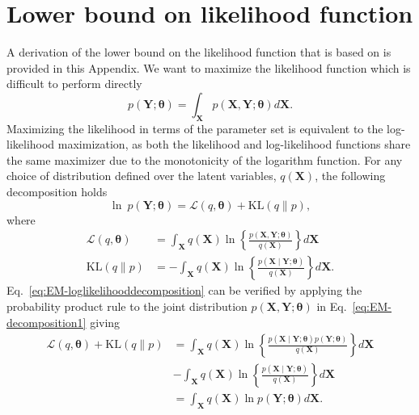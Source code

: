 \documentclass[review,authoryear,3p]{elsarticle}
\begin{document}
\section{Lower bound on likelihood function}\label{ap:Lowerbound}
A derivation of the lower bound on the likelihood function that is based on \citet{Bishop2006} is provided in this Appendix. We want to maximize the likelihood function which is difficult to perform directly
\begin{equation}
 p(\mathbf Y;\boldsymbol\theta)=\int_{\mathbf X}p(\mathbf X,\mathbf Y;\boldsymbol\theta)d\mathbf X.
\end{equation}   
Maximizing the likelihood in terms of the parameter set is equivalent to the log-likelihood maximization, as both the likelihood and log-likelihood functions share the same maximizer due to the monotonicity of the logarithm function. For any choice of distribution defined over the latent variables, $q(\mathbf X)$, the following decomposition holds
\begin{equation}\label{eq:EM-loglikelihooddecomposition}
 \ln~p(\mathbf Y;\boldsymbol\theta)=\mathcal{L}(q,\boldsymbol\theta)+\mathrm{KL}(q\parallel p),
\end{equation}
where
\begin{align}
 \mathcal{L}(q,\boldsymbol\theta)&=\int_{\mathbf X} q(\mathbf X)\ln\left\lbrace \frac{p(\mathbf X,\mathbf Y;\boldsymbol\theta)}{q(\mathbf X)} \right\rbrace d\mathbf X \label{eq:EM-decomposition1}\\
\mathrm{KL}(q\parallel p)&=-\int_{\mathbf X}q(\mathbf X)\ln\left\lbrace \frac{p(\mathbf X \mid \mathbf Y;\boldsymbol\theta)}{q(\mathbf X)} \right\rbrace d\mathbf X. \label{eq:EM-decomposition2}
\end{align}
Eq.~\eqref{eq:EM-loglikelihooddecomposition} can be verified by applying the probability product rule to the joint distribution $p(\mathbf X,\mathbf Y;\boldsymbol\theta)$ in Eq.~\eqref{eq:EM-decomposition1} giving
\begin{align}
	\mathcal{L}(q,\boldsymbol\theta)+\mathrm{KL}(q\parallel p)&= \int_{\mathbf X} q(\mathbf X)\ln\left\lbrace \frac{p(\mathbf X \mid \mathbf Y;\boldsymbol\theta)p(\mathbf Y;\boldsymbol\theta)}{q(\mathbf X)} \right\rbrace d\mathbf X \nonumber\\
	&- \int_{\mathbf X}q(\mathbf X)\ln\left\lbrace \frac{p(\mathbf X \mid \mathbf Y;\boldsymbol\theta)}{q(\mathbf X)} \right\rbrace d\mathbf X\nonumber\\
	&= \int_{\mathbf X}q(\mathbf X)\ln p(\mathbf Y; \boldsymbol\theta)d\mathbf X.
\end{align}
\end{document}
